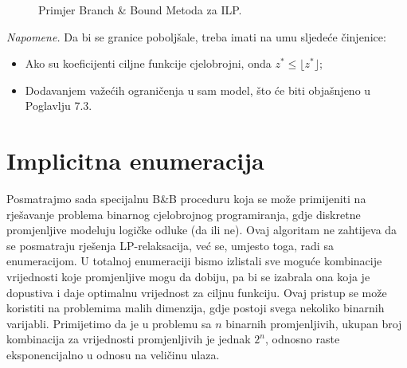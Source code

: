 \documentclass[a4paper, utf8, 11pt, colorlinks]{book}
\theoremstyle{definition}
\def\textA{$L_0$:\\
	$(x^*, y^*)=(2.25, 3.75)$ \\
	$z = 41.25$ \\
	 $z^* \leq 41$
	 
}
\def\textB{$\text{min}\  x_1-2x_2$\\
	subject to\\
	\hspace{1cm}\vdots
	\nodepart{two}
	{\scriptsize $x_1^*=1,x_2^*=2.1667$}
}
\def\textC{$L_1$:\\
	 $x^*=(1.8,  4)$\\
	 $z=41$ \\
	$z^* \leq 41$ 
}
\def\textD{$L_2$\\
	$x^*=(3, 3)$ \\
	$z = 39 = LB$
}
\def\textE{$L_3$:\\
	podproblem nedopustiv
 }
\def\textF{ $L_4$:\\
    $x^*=(1, 4\frac{4}{9})$ \\
    $z=40\frac{5}{9}$  \\
    $z^* \leq 40$
}
\def\textG{$L_5$: \\
	$x^*=(1, 4)$ \\
	$z=37<LB$
}
\def\textH{$L_6$: \\
	$x^*=(0, 5)$ \\
	$z=LB = 40 $
}
\begin{document}

\begin{figure}[!ht]
	\centering
	\caption{Primjer Branch \& Bound  Metoda za ILP.}
	\label{fig:bnb_ilp}
\end{figure}


\emph{Napomene.} Da bi se granice  poboljšale, treba imati na umu sljedeće činjenice:
\begin{itemize}
	\item Ako su koeficijenti ciljne funkcije cjelobrojni, onda $z^* \leq \lfloor z^* \rfloor$;
	\item Dodavanjem važećih ograničenja u sam model, što će biti objašnjeno u Poglavlju 7.3. 
\end{itemize}



\section{Implicitna enumeracija}
Posmatrajmo sada specijalnu B\&B proceduru koja se može primijeniti na rješavanje problema binarnog cjelobrojnog programiranja, gdje diskretne promjenljive modeluju logičke odluke (da ili ne). Ovaj algoritam ne zahtijeva da se posmatraju rješenja LP-relaksacija, već se, umjesto toga, radi sa enumeracijom. U totalnoj enumeraciji bismo izlistali sve moguće kombinacije vrijednosti koje promjenljive mogu da dobiju, pa bi se izabrala ona koja je dopustiva i daje optimalnu vrijednost za ciljnu funkciju. Ovaj pristup se može koristiti na problemima malih dimenzija, gdje postoji svega nekoliko binarnih varijabli. Primijetimo da je u problemu sa $n$ binarnih promjenljivih, ukupan broj kombinacija za vrijednosti promjenljivih je jednak $2^n$, odnosno raste eksponencijalno u odnosu na veličinu ulaza. 
\end{document}
